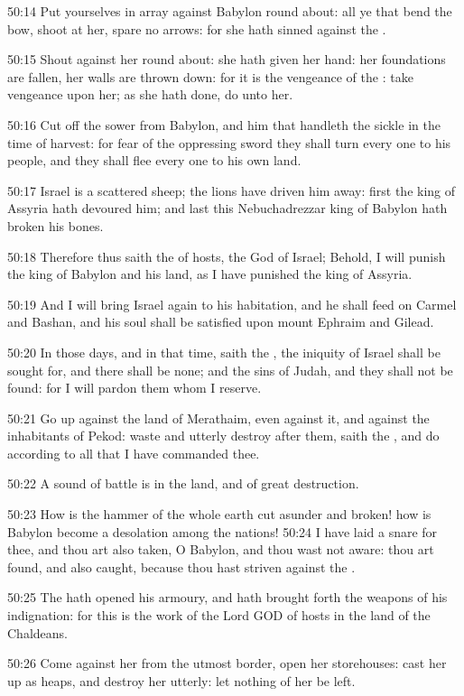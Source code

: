 50:14 Put yourselves in array against Babylon round about: all ye that bend the bow, shoot at her, spare no arrows: for she hath sinned against the \LORD.

50:15 Shout against her round about: she hath given her hand: her foundations are fallen, her walls are thrown down: for it is the vengeance of the \LORD: take vengeance upon her; as she hath done, do unto her.

50:16 Cut off the sower from Babylon, and him that handleth the sickle in the time of harvest: for fear of the oppressing sword they shall turn every one to his people, and they shall flee every one to his own land.

50:17 Israel is a scattered sheep; the lions have driven him away: first the king of Assyria hath devoured him; and last this Nebuchadrezzar king of Babylon hath broken his bones.

50:18 Therefore thus saith the \LORD of hosts, the God of Israel; Behold, I will punish the king of Babylon and his land, as I have punished the king of Assyria.

50:19 And I will bring Israel again to his habitation, and he shall feed on Carmel and Bashan, and his soul shall be satisfied upon mount Ephraim and Gilead.

50:20 In those days, and in that time, saith the \LORD, the iniquity of Israel shall be sought for, and there shall be none; and the sins of Judah, and they shall not be found: for I will pardon them whom I reserve.

50:21 Go up against the land of Merathaim, even against it, and against the inhabitants of Pekod: waste and utterly destroy after them, saith the \LORD, and do according to all that I have commanded thee.

50:22 A sound of battle is in the land, and of great destruction.

50:23 How is the hammer of the whole earth cut asunder and broken! how is Babylon become a desolation among the nations!  50:24 I have laid a snare for thee, and thou art also taken, O Babylon, and thou wast not aware: thou art found, and also caught, because thou hast striven against the \LORD.

50:25 The \LORD hath opened his armoury, and hath brought forth the weapons of his indignation: for this is the work of the Lord GOD of hosts in the land of the Chaldeans.

50:26 Come against her from the utmost border, open her storehouses: cast her up as heaps, and destroy her utterly: let nothing of her be left.

